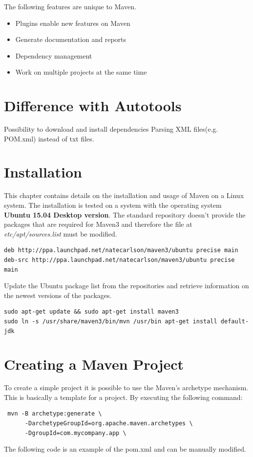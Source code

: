 The following features are unique to Maven.
\begin{itemize}
	\item Plugins enable new features on Maven
	\item Generate documentation and reports
	\item Dependency management
	\item Work on multiple projects at the same time
\end{itemize}

\section{Difference with Autotools}
Possibility to download and install dependencies Parsing XML files(e.g. POM.xml) instead of txt files. 

\section{Installation}
This chapter contains details on the installation and usage of Maven on a Linux system. The installation is tested on a system with the operating system \textbf{Ubuntu 15.04 Desktop version}.
The standard repository doesn't provide the packages that are required for Maven3 and therefore the file at \mbox{\textit{etc/apt/sources.list}} must be modified.

\begin{verbatim}
deb http://ppa.launchpad.net/natecarlson/maven3/ubuntu precise main
deb-src http://ppa.launchpad.net/natecarlson/maven3/ubuntu precise main
\end{verbatim}

Update the Ubuntu package list from the repositories and retrieve information on the newest versions of the packages.

\begin{verbatim}
sudo apt-get update && sudo apt-get install maven3 
sudo ln -s /usr/share/maven3/bin/mvn /usr/bin apt-get install default-jdk
\end{verbatim}

\section{Creating a Maven Project}
To create a simple project it is possible to use the Maven's archetype mechanism\cite{maven-book}. This is basically a template for a project. By executing the following command: 
\begin{verbatim}
 mvn -B archetype:generate \
      -DarchetypeGroupId=org.apache.maven.archetypes \
      -DgroupId=com.mycompany.app \
\end{verbatim}
The following code is an example of the pom.xml and can be manually modified.

